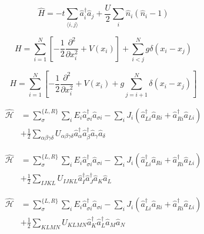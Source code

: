\documentclass[aps,floatfix,showpacs,pra]{revtex4}
\begin{document}
\begin{equation}
 \hat{H} = -t \sum\limits_{\langle i,j \rangle} \hat{a}^\dagger_i \hat{a}_j + \frac{U}{2} \sum\limits_i \hat{n}_i (\hat{n}_i - 1)
\end{equation}

\begin{equation}
 H = \sum\limits_{i=1}^N \left[ - \frac{1}{2} \frac{\partial^2}{\partial x_i^2} + V(x_i) \right] + \sum\limits_{i < j}^N g \delta(x_i-x_j)
\end{equation}

\begin{equation}
 H = \sum\limits_{i=1}^N \left[ - \frac{1}{2} \frac{\partial^2}{\partial x_i^2} + V(x_i) + g \sum\limits_{j=i+1}^N \delta(x_i-x_j) \right]
\end{equation}

\begin{equation}
\begin{split}
 \hat{\mathcal{H}} &= \sum\limits_{\sigma}^{\{L,R\}} \sum\limits_i E_i \hat{a}_{\sigma i}^\dagger \hat{a}_{\sigma i} - \sum\limits_i J_i (\hat{a}_{Li}^\dagger \hat{a}_{Ri} + \hat{a}_{Ri}^\dagger \hat{a}_{Li}) \\
 &+ \frac{1}{2} \sum\limits_{\alpha \beta \gamma \delta} U_{\alpha \beta \gamma \delta} \hat{a}_\alpha^\dagger \hat{a}_\beta^\dagger \hat{a}_\gamma \hat{a}_\delta
 \end{split}
\end{equation}

\begin{equation}
\begin{split}
 \hat{\mathcal{H}} &= \sum\limits_{\sigma}^{\{L,R\}} \sum\limits_i E_i \hat{a}_{\sigma i}^\dagger \hat{a}_{\sigma i} - \sum\limits_i J_i (\hat{a}_{Li}^\dagger \hat{a}_{Ri} + \hat{a}_{Ri}^\dagger \hat{a}_{Li}) \\
 &+ \frac{1}{2} \sum\limits_{IJKL} U_{IJKL} \hat{a}_I^\dagger \hat{a}_J^\dagger \hat{a}_K \hat{a}_L
 \end{split}
\end{equation}

\begin{equation}
\begin{split}
 \hat{\mathcal{H}} &= \sum\limits_{\sigma}^{\{L,R\}} \sum\limits_i E_i \hat{a}_{\sigma i}^\dagger \hat{a}_{\sigma i} - \sum\limits_i J_i (\hat{a}_{Li}^\dagger \hat{a}_{Ri} + \hat{a}_{Ri}^\dagger \hat{a}_{Li}) \\
 &+ \frac{1}{2} \sum\limits_{KLMN} U_{KLMN} \hat{a}_K^\dagger \hat{a}_L^\dagger \hat{a}_M \hat{a}_N
 \end{split}
\end{equation}
\end{document}

